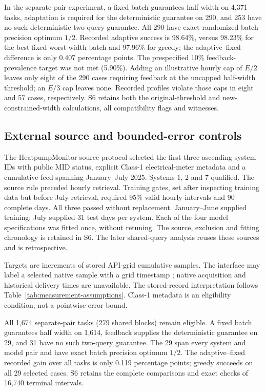 \documentclass[12pt]{article}
\begin{document}
In the separate-pair experiment, a fixed batch guarantees half width on
4,371 tasks, adaptation is required for the deterministic guarantee on 290,
and 253 have no such deterministic two-query guarantee. All 290 have exact
randomized-batch precision optimum $1/2$. Recorded adaptive success is
98.64\%, versus 98.23\% for the best fixed worst-width batch and 97.96\% for
greedy; the adaptive--fixed difference is only 0.407 percentage points.
The prespecified 10\% feedback-prevalence target was not met (5.90\%).
Adding an illustrative hourly cap of $E/2$ leaves only eight of the 290
cases requiring feedback at the uncapped half-width threshold; an $E/3$
cap leaves none. Recorded profiles violate those caps in eight and 57
cases, respectively. S6 retains both the original-threshold and
new-constrained-width calculations, all compatibility flags and witnesses.

\subsection{External source and bounded-error controls}
\label{sec:external-hpm}
The HeatpumpMonitor source protocol \citep{hpmabout,hpmapi} selected the
first three ascending system IDs with public MID status, explicit Class-1
electrical-meter metadata and a cumulative feed spanning January--July
2025. Systems 1, 2 and 7 qualified. The source rule preceded hourly
retrieval. Training gates, set after inspecting training data but before
July retrieval, required 95\% valid hourly intervals and 90 complete days.
All three passed without replacement. January--June supplied training;
July supplied 31 test days per system. Each of the four model specifications
was fitted once, without retuning. The source, exclusion and fitting
chronology is retained in S6. The later shared-query analysis reuses these
sources and is retrospective.

Targets are increments of stored API-grid cumulative samples. The interface
may label a selected native sample with a grid timestamp \citep{hpmcode};
native acquisition and historical delivery times are unavailable. The
stored-record interpretation follows Table~\ref{tab:measurement-assumptions}.
Class-1 metadata is an eligibility condition, not a pointwise error bound.

All 1,674 separate-pair tasks (279 shared blocks) remain eligible. A fixed
batch guarantees half width on 1,614, feedback supplies the deterministic
guarantee on 29, and 31 have no such two-query guarantee. The 29 span every
system and model pair and have exact batch precision optimum $1/2$.
The adaptive--fixed recorded gain over all tasks is only 0.119 percentage
points; greedy succeeds on all 29 selected cases. S6 retains the complete
comparisons and exact checks of 16,740 terminal intervals.
\end{document}
